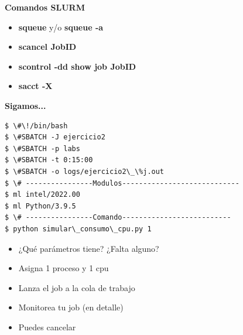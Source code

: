 \documentclass[aspectratio=169,professionalfonts]{beamer}
\begin{document}
\begin{frame}{\textbf{Comandos SLURM}}
    \begin{itemize}
        \item \textbf{squeue} y/o \textbf{squeue -a}
         \vspace{0.5em} 
        \item \textbf{scancel JobID}
         \vspace{0.5em} 
        \item \textbf{scontrol -dd show job JobID}
         \vspace{0.5em} 
        \item \textbf{sacct -X}
        
    \end{itemize}
\end{frame}


\begin{frame}[fragile]{\textbf{Sigamos...}}


\begin{verbatim}
$ \#\!/bin/bash 
$ \#SBATCH -J ejercicio2 
$ \#SBATCH -p labs 
$ \#SBATCH -t 0:15:00 
$ \#SBATCH -o logs/ejercicio2\_\%j.out 
$ \# ----------------Modulos---------------------------- 
$ ml intel/2022.00
$ ml Python/3.9.5 
$ \# ----------------Comando-------------------------- 
$ python simular\_consumo\_cpu.py 1
\end{verbatim}



\begin{itemize}
    \item ¿Qué parámetros tiene? ¿Falta alguno?
         \vspace{0.5em} 
    \item Asigna 1 proceso y 1 cpu
         \vspace{0.5em} 
    \item Lanza el job a la cola de trabajo
         \vspace{0.5em} 
    \item Monitorea tu job (en detalle)
         \vspace{0.5em} 
    \item Puedes cancelar 
\end{itemize}
    
\end{frame}
\end{document}
